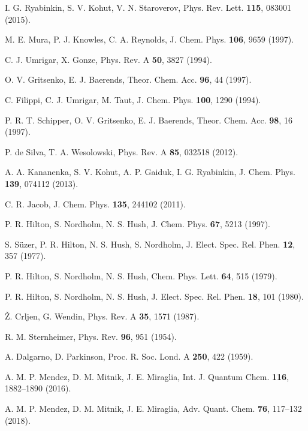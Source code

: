 \begin{thebibliography}{9}
I. G. Ryabinkin, S. V. Kohut, V. N. Staroverov,
Phys. Rev. Lett. \textbf{115}, 083001 (2015).

M. E. Mura, P. J. Knowles, C. A. Reynolds,
J. Chem. Phys. \textbf{106}, 9659 (1997).

C. J. Umrigar, X. Gonze,
Phys. Rev. A \textbf{50}, 3827 (1994).

O. V. Gritsenko, E. J. Baerends, 
Theor. Chem. Acc. \textbf{96}, 44 (1997).

C. Filippi, C. J. Umrigar, M. Taut, 
J. Chem. Phys. \textbf{100}, 1290 (1994).

P. R. T. Schipper, O. V. Gritsenko, E. J. Baerends,
Theor. Chem. Acc. \textbf{98}, 16 (1997).

P. de Silva, T. A. Wesolowski,
Phys. Rev. A \textbf{85}, 032518 (2012).

A. A. Kananenka, S. V. Kohut, A. P. Gaiduk, I. G. Ryabinkin, 
J. Chem. Phys. \textbf{139}, 074112 (2013).

C. R. Jacob,
J. Chem. Phys. \textbf{135}, 244102 (2011).

P. R. Hilton, S. Nordholm, N. S. Hush, 
J. Chem. Phys. \textbf{67}, 5213 (1997).

S. S{\"u}zer, P. R. Hilton, N. S. Hush, S. Nordholm,
J. Elect. Spec. Rel. Phen. \textbf{12}, 357 (1977).

P. R. Hilton, S. Nordholm, N. S. Hush,
Chem. Phys. Lett. \textbf{64}, 515 (1979).

P. R. Hilton, S. Nordholm, N. S. Hush, 
J. Elect. Spec. Rel. Phen. \textbf{18}, 101 (1980).

{\v Z}. Crljen, G. Wendin,
Phys. Rev. A \textbf{35}, 1571 (1987).

R. M. Sternheimer, 
Phys. Rev. \textbf{96}, 951 (1954).

A. Dalgarno, D. Parkinson,
Proc. R. Soc. Lond. A \textbf{250}, 422 (1959).

A. M. P. Mendez, D. M. Mitnik, J. E. Miraglia, 
Int. J. Quantum Chem. \textbf{116}, 1882--1890 (2016).

A. M. P. Mendez, D. M. Mitnik, J. E. Miraglia, 
Adv. Quant. Chem. \textbf{76}, 117--132 (2018).


\end{thebibliography}
